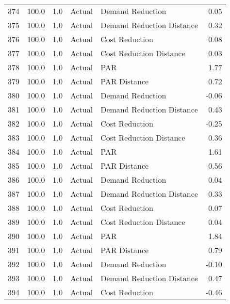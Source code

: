 \begin{longtable}{lrrllr}
374  &        100.0 &     1.0 &         Actual &           Demand Reduction &   0.05 \\
375  &        100.0 &     1.0 &         Actual &  Demand Reduction Distance &   0.32 \\
376  &        100.0 &     1.0 &         Actual &             Cost Reduction &   0.08 \\
377  &        100.0 &     1.0 &         Actual &    Cost Reduction Distance &   0.03 \\
378  &        100.0 &     1.0 &         Actual &                        PAR &   1.77 \\
379  &        100.0 &     1.0 &         Actual &               PAR Distance &   0.72 \\
380  &        100.0 &     1.0 &         Actual &           Demand Reduction &  -0.06 \\
381  &        100.0 &     1.0 &         Actual &  Demand Reduction Distance &   0.43 \\
382  &        100.0 &     1.0 &         Actual &             Cost Reduction &  -0.25 \\
383  &        100.0 &     1.0 &         Actual &    Cost Reduction Distance &   0.36 \\
384  &        100.0 &     1.0 &         Actual &                        PAR &   1.61 \\
385  &        100.0 &     1.0 &         Actual &               PAR Distance &   0.56 \\
386  &        100.0 &     1.0 &         Actual &           Demand Reduction &   0.04 \\
387  &        100.0 &     1.0 &         Actual &  Demand Reduction Distance &   0.33 \\
388  &        100.0 &     1.0 &         Actual &             Cost Reduction &   0.07 \\
389  &        100.0 &     1.0 &         Actual &    Cost Reduction Distance &   0.04 \\
390  &        100.0 &     1.0 &         Actual &                        PAR &   1.84 \\
391  &        100.0 &     1.0 &         Actual &               PAR Distance &   0.79 \\
392  &        100.0 &     1.0 &         Actual &           Demand Reduction &  -0.10 \\
393  &        100.0 &     1.0 &         Actual &  Demand Reduction Distance &   0.47 \\
394  &        100.0 &     1.0 &         Actual &             Cost Reduction &  -0.46 \\

\end{longtable}
